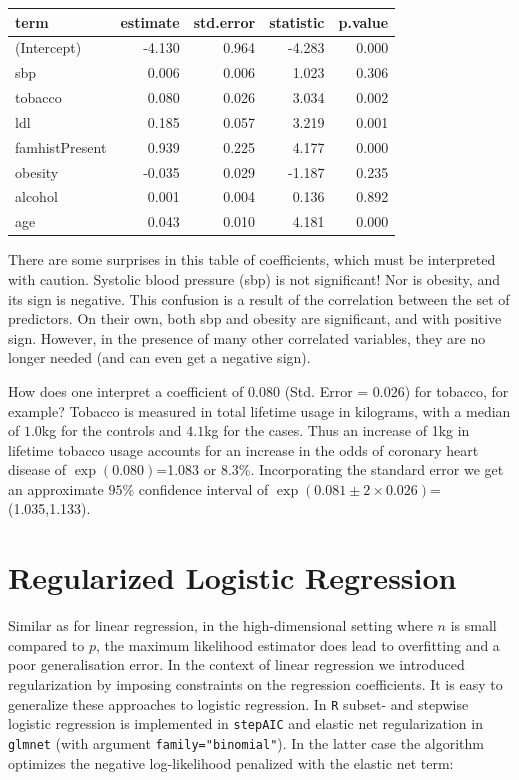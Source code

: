 \documentclass[
]{book}
\begin{document}
\begin{tabular}{lrrrr}
\toprule
term & estimate & std.error & statistic & p.value\\
\midrule
(Intercept) & -4.130 & 0.964 & -4.283 & 0.000\\
sbp & 0.006 & 0.006 & 1.023 & 0.306\\
tobacco & 0.080 & 0.026 & 3.034 & 0.002\\
ldl & 0.185 & 0.057 & 3.219 & 0.001\\
famhistPresent & 0.939 & 0.225 & 4.177 & 0.000\\
\addlinespace
obesity & -0.035 & 0.029 & -1.187 & 0.235\\
alcohol & 0.001 & 0.004 & 0.136 & 0.892\\
age & 0.043 & 0.010 & 4.181 & 0.000\\
\bottomrule
\end{tabular}

There are some surprises in this table of coefficients, which must be interpreted with caution. Systolic blood pressure (sbp) is not significant! Nor
is obesity, and its sign is negative. This confusion is a result of the correlation between the set of predictors. On their own, both sbp and obesity
are significant, and with positive sign. However, in the presence of many other correlated variables, they are no longer needed (and can even get a
negative sign).

How does one interpret a coefficient of \(0.080\) (Std. Error = \(0.026\)) for
tobacco, for example? Tobacco is measured in total lifetime usage in kilograms, with a median of \(1.0\)kg for the controls and \(4.1\)kg for the cases. Thus
an increase of 1kg in lifetime tobacco usage accounts for an increase in the
odds of coronary heart disease of \(\exp(0.080)\)=1.083 or \(8.3\)\%. Incorporating the standard error we get an approximate \(95\)\% confidence interval of
\(\exp(0.081 ± 2 × 0.026)\)=(1.035,1.133).

\hypertarget{regularized-logistic-regression}{%
\section{Regularized Logistic Regression}\label{regularized-logistic-regression}}

Similar as for linear regression, in the high-dimensional setting where \(n\) is small compared to \(p\), the maximum likelihood estimator does lead to overfitting and a poor generalisation error. In the context of linear regression we introduced regularization by imposing constraints on the regression coefficients. It is easy to generalize these approaches to logistic regression. In \texttt{R} subset- and stepwise logistic regression is implemented in \texttt{stepAIC} and elastic net regularization in \texttt{glmnet} (with argument \texttt{family="binomial"}). In the latter case the algorithm optimizes the negative log-likelihood penalized with the elastic net term:
\end{document}
